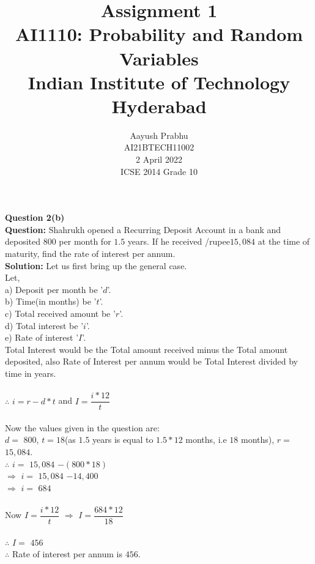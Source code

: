 \documentclass[journal,12pt,twocolumn]{IEEEtran}
\title{Assignment 1 \\ \Large AI1110: Probability and Random Variables \\ \large Indian Institute of Technology Hyderabad}
\author{Aayush Prabhu \\ \normalsize AI21BTECH11002 \\ \vspace*{20pt} \normalsize  2 April 2022 \\ \vspace*{20pt} \Large ICSE 2014 Grade 10}
\begin{document}
       \maketitle
       \textbf{Question 2(b)}\\
       \textbf{Question:} Shahrukh opened a Recurring Deposit Account in a bank and deposited \rupee$800$ per month for $1.5$ years. If he received /rupee$15,084$ at the time of maturity, find the rate of interest per annum.\\
       \textbf{Solution:} Let us first bring up the general case.\\
       Let,\\
       a) Deposit per month be '$d$'.\\
       b) Time(in months) be '$t$'.\\
       c) Total received amount be '$r$'.\\
       d) Total interest be '$i$'.\\
       e) Rate of interest '$I$'.\\
       Total Interest would be the Total amount received minus the Total amount deposited, also Rate of Interest per annum would be Total Interest divided by time in years.\\\\
       $\therefore$ $i=r-d*t$ and $I=\dfrac{i*12}{t}$\\\\
       Now the values given in the question are:\\
       $d=$ \rupee$800$, $t=18$(as $1.5$ years is equal to $1.5*12$ months, i.e $18$ months), $r=$ \rupee$15,084$.\\
       $\therefore$ $i=$ \rupee$15,084$ $-$\rupee$(800*18)$\\
       $\Rightarrow$ $i=$ \rupee$15,084$ $-$\rupee$14,400$\\
       $\Rightarrow$ $i=$ \rupee$684$\\\\
       Now $I=\dfrac{i*12}{t}$
       $\Rightarrow$ $I=\dfrac{684*12}{18}$\\\\
       $\therefore$ $I=$ \rupee$456$\\
       $\therefore$ Rate of interest per annum is \rupee$456$.
\end{document}
